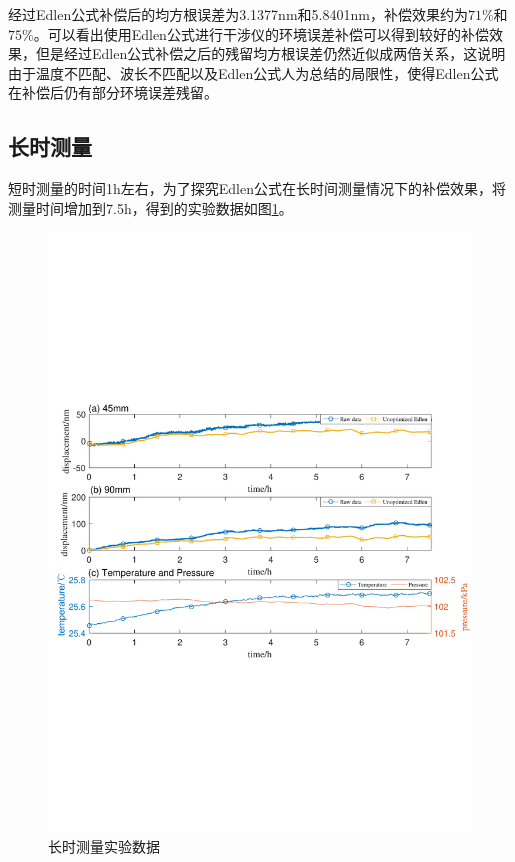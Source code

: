 经过Edlen公式补偿后的均方根误差为3.1377nm和5.8401nm，补偿效果约为$71\%$和$75\%$。可以看出使用Edlen公式进行干涉仪的环境误差补偿可以得到较好的补偿效果，但是经过Edlen公式补偿之后的残留均方根误差仍然近似成两倍关系，这说明由于温度不匹配、波长不匹配以及Edlen公式人为总结的局限性，使得Edlen公式在补偿后仍有部分环境误差残留。

\subsection{长时测量}
短时测量的时间1h左右，为了探究Edlen公式在长时间测量情况下的补偿效果，将测量时间增加到7.5h，得到的实验数据如图\ref{fig:长时测量实验数据}。
\begin{figure}[htb]
  \centering
  \includegraphics[width=14cm]{fig/3-fig/长时测量数据.pdf}
  \caption{长时测量实验数据}
  \label{fig:长时测量实验数据}
\end{figure}

